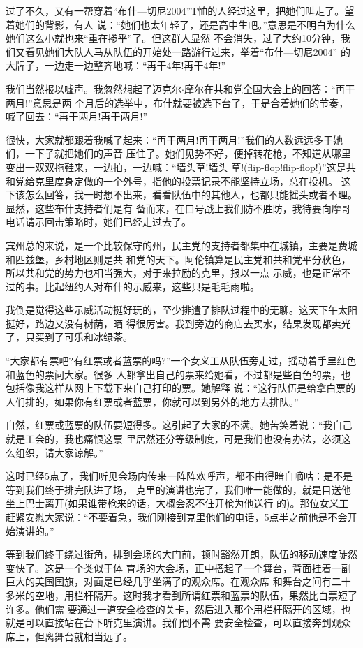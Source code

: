 ﻿\documentclass[11pt]{article}
\begin{document}
过了不久，又有一帮穿着``布什---切尼2004''T恤的人经过这里，把她们叫走了。望着她们的背影，有人
说：``她们也太年轻了，还是高中生吧。''意思是不明白为什么她们这么小就也来``重在掺乎''了。但这群人显然
不会消失，过了大约10分钟，我们又看见她们大队人马从队伍的开始处一路游行过来，举着``布什---切尼2004''
的大牌子，一边走一边整齐地喊：``再干4年!再干4年!''

我们当然报以嘘声。我忽然想起了迈克尔$\cdot$摩尔在共和党全国大会上的回答：``再干两月!''意思是两
个月后的选举中，布什就要被选下台了，于是合着她们的节奏，喊了回去：``再干两月!再干两月!''

很快，大家就都跟着我喊了起来：``再干两月!再干两月!''我们的人数远远多于她们，一下子就把她们的声音
压住了。她们见势不好，便掉转花枪，不知道从哪里变出一双双拖鞋来，一边拍，一边喊：``墙头草!墙头
草!(flip-flop!flip-flop!)''这是共和党给克里度身定做的一个外号，指他的投票记录不能坚持立场，总在投机。
这下该怎么回答，我一时想不出来，看看队伍中的其他人，也都只能摇头或者不理。显然，这些布什支持者们是有
备而来，在口号战上我们防不胜防，我待要向摩哥电话请示回击策略时，她们已经走过去了。


宾州总的来说，是一个比较保守的州，民主党的支持者都集中在城镇，主要是费城和匹兹堡，乡村地区则是共
和党的天下。阿伦镇算是民主党和共和党平分秋色，所以共和党的势力也相当强大，对于来拉励的克里，报以一点
示威，也是正常不过的事。比起纽约人对布什的示威来，这些只是毛毛雨啦。

我倒是觉得这些示威活动挺好玩的，至少排遣了排队过程中的无聊。这天下午太阳挺好，路边又没有树荫，晒
得很厉害。我到旁边的商店去买水，结果发现都卖光了，只买到了可乐和冰绿茶。

``大家都有票吧?有红票或者蓝票的吗?''一个女义工从队伍旁走过，摇动着手里红色和蓝色的票问大家。很多
人都拿出自己的票来给她看，不过都是些白色的票，也包括像我这样从网上下载下来自己打印的票。她解释
说：``这行队伍是给拿白票的人们排的，如果你有红票或者蓝票，你就可以到另外的地方去排队。''

自然，红票或蓝票的队伍要短得多。这引起了大家的不满。她苦笑着说：``我自己就是工会的，我也痛恨这票
里居然还分等级制度，可是我们也没有办法，必须这么组织，请大家谅解。''

这时已经5点了，我们听见会场内传来一阵阵欢呼声，都不由得暗自嘀咕：是不是等到我们终于排完队进了场，
克里的演讲也完了，我们唯一能做的，就是目送他坐上巴士离开(如果谁带枪来的话，大概会忍不住开枪为他送行
的)。那位女义工赶紧安慰大家说：``不要着急，我们刚接到克里他们的电话，5点半之前他是不会开始演讲的。''

等到我们终于绕过街角，排到会场的大门前，顿时豁然开朗，队伍的移动速度陡然变快了。这是一个类似于体
育场的大会场，正中搭起了一个舞台，背面挂着一副巨大的美国国旗，对面是已经几乎坐满了的观众席。在观众席
和舞台之间有二十多米的空地，用栏杆隔开。这时我才看到所谓红票和蓝票的队伍，果然比白票短了许多。他们需
要通过一道安全检查的关卡，然后进入那个用栏杆隔开的区域，也就是可以直接站在台下听克里演讲。我们倒不需
要安全检查，可以直接奔到观众席上，但离舞台就相当远了。
\end{document}
